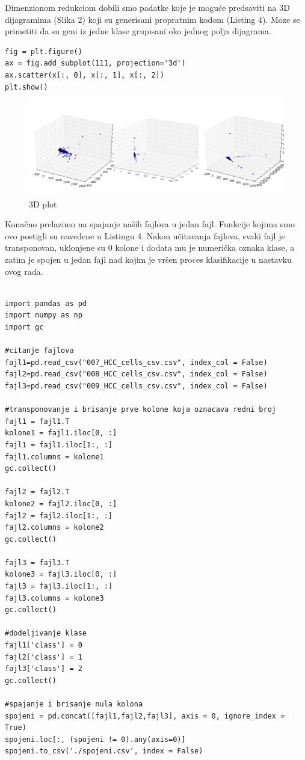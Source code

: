 \documentclass[14pt]{extarticle}
\begin{document}
Dimenzionom redukciom dobili smo padatke koje je moguće predsaviti na 3D dijagramima (Slika 2) koji su generisani propratnim kodom (Listing 4). Moze se primetiti da su geni iz jedne klase grupisani oko jednog polja dijagrama. 

\begin{lstlisting}[caption={Vizuelizacija},frame=single, label=simple]
fig = plt.figure()
ax = fig.add_subplot(111, projection='3d')
ax.scatter(x[:, 0], x[:, 1], x[:, 2])
plt.show()

\end{lstlisting}
\begin{figure}[h!]
\begin{center}
\includegraphics[scale=0.25]{slika2.jpg}
\end{center}
\caption{3D plot}
\label{fig:pande}
\end{figure}

Konačno prelazimo na spajanje naših fajlova u jedan fajl. Funkcije kojima smo ovo postigli su navedene u Listingu 4. Nakon učitavanja fajlova, svaki fajl je transponovan, uklonjene su 0 kolone i dodata mu je numerička oznaka klase, a zatim je spojen u jedan fajl nad kojim je vršen proces klasifikacije u nastavku ovog rada. \cite{p}\cite{s}

\begin{lstlisting}[caption={Spajanje},frame=single, label=simple]

import pandas as pd
import numpy as np
import gc

#citanje fajlova
fajl1=pd.read_csv("007_HCC_cells_csv.csv", index_col = False)
fajl2=pd.read_csv("008_HCC_cells_csv.csv", index_col = False)
fajl3=pd.read_csv("009_HCC_cells_csv.csv", index_col = False)

#transponovanje i brisanje prve kolone koja oznacava redni broj
fajl1 = fajl1.T
kolone1 = fajl1.iloc[0, :]
fajl1 = fajl1.iloc[1:, :]
fajl1.columns = kolone1
gc.collect()

fajl2 = fajl2.T
kolone2 = fajl2.iloc[0, :]
fajl2 = fajl2.iloc[1:, :]
fajl2.columns = kolone2
gc.collect()

fajl3 = fajl3.T
kolone3 = fajl3.iloc[0, :]
fajl3 = fajl3.iloc[1:, :]
fajl3.columns = kolone3
gc.collect()

#dodeljivanje klase
fajl1['class'] = 0
fajl2['class'] = 1
fajl3['class'] = 2
gc.collect()

#spajanje i brisanje nula kolona
spojeni = pd.concat([fajl1,fajl2,fajl3], axis = 0, ignore_index = True)
spojeni.loc[:, (spojeni != 0).any(axis=0)]
spojeni.to_csv('./spojeni.csv', index = False)
  

\end{lstlisting}
\end{document}
